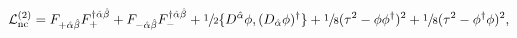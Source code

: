 \begin{equation}\label{eq:leea-nc}
 \mathcal{L}^{(2)}_{\text{nc}}=F_{+\hat{\alpha}\hat{\beta}}
 F_+^{\dagger\hat{\alpha}\hat{\beta}}+F_{-\hat{\alpha}\hat{\beta}}
 F_-^{\dagger\hat{\alpha}\hat{\beta}}+\sfrac{1}{2}\{D^{\hat{\alpha}}
 \phi,(D_{\hat{\alpha}}\phi)^\dagger\}+\sfrac{1}{8}(\tau^2-\phi
 \phi^\dagger)^2+\sfrac{1}{8}(\tau^2-\phi^\dagger\phi)^2,
\end{equation}

